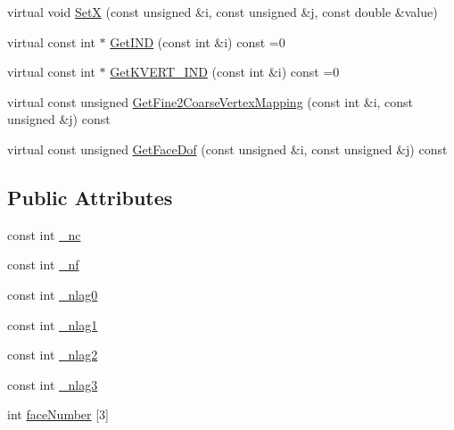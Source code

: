 \begin{DoxyCompactItemize}
virtual void \mbox{\hyperlink{classfemus_1_1basis_abbb9deb1bd0b2d07a4b2995b07d58d2e}{SetX}} (const unsigned \&i, const unsigned \&j, const double \&value)
\item 
virtual const int $\ast$ \mbox{\hyperlink{classfemus_1_1basis_a3f63ad97ce70cd4a1196ede69f1f144b}{Get\+I\+ND}} (const int \&i) const =0
\item 
virtual const int $\ast$ \mbox{\hyperlink{classfemus_1_1basis_a95ceb3feae4c484b0baa6a4d35d38909}{Get\+K\+V\+E\+R\+T\+\_\+\+I\+ND}} (const int \&i) const =0
\item 
virtual const unsigned \mbox{\hyperlink{classfemus_1_1basis_a2ba867dcfa634c47f1c52caddd9bfdba}{Get\+Fine2\+Coarse\+Vertex\+Mapping}} (const int \&i, const unsigned \&j) const
\item 
virtual const unsigned \mbox{\hyperlink{classfemus_1_1basis_a06f93864b6ce0925d41bf08173dc2500}{Get\+Face\+Dof}} (const unsigned \&i, const unsigned \&j) const
\end{DoxyCompactItemize}
\subsection*{Public Attributes}
\begin{DoxyCompactItemize}
\item 
const int \mbox{\hyperlink{classfemus_1_1basis_a8beaeb66f172e318e6f4daa22af0ee29}{\+\_\+nc}}
\item 
const int \mbox{\hyperlink{classfemus_1_1basis_ac52171231d44a30dfca075c6918d8197}{\+\_\+nf}}
\item 
const int \mbox{\hyperlink{classfemus_1_1basis_a1fd290cb7382616e14715756917d73c1}{\+\_\+nlag0}}
\item 
const int \mbox{\hyperlink{classfemus_1_1basis_ab2e292cf67cf16101dac730b9a3b0fd0}{\+\_\+nlag1}}
\item 
const int \mbox{\hyperlink{classfemus_1_1basis_a19491d79d0fb5ef8135a51460502041c}{\+\_\+nlag2}}
\item 
const int \mbox{\hyperlink{classfemus_1_1basis_afe89e7da4ba55df0492ee96f6bb04838}{\+\_\+nlag3}}
\item 
int \mbox{\hyperlink{classfemus_1_1basis_a21732cfb1bec4383fd050d218dfed070}{face\+Number}} \mbox{[}3\mbox{]}
\end{DoxyCompactItemize}
